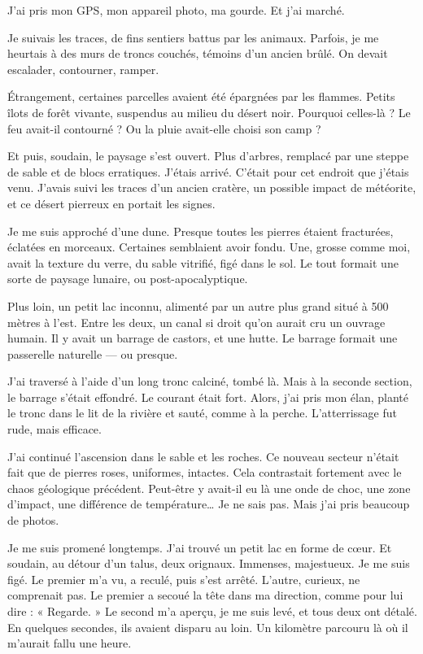 J’ai pris mon GPS, mon appareil photo, ma gourde. Et j’ai marché.

Je suivais les traces, de fins sentiers battus par les animaux. Parfois, je me heurtais à des murs de troncs couchés, témoins d’un ancien brûlé. On devait escalader, contourner, ramper.

Étrangement, certaines parcelles avaient été épargnées par les flammes. Petits îlots de forêt vivante, suspendus au milieu du désert noir. Pourquoi celles-là ? Le feu avait-il contourné ? Ou la pluie avait-elle choisi son camp ?

Et puis, soudain, le paysage s’est ouvert. Plus d’arbres, remplacé par une steppe de sable et de blocs erratiques. J’étais arrivé. C’était pour cet endroit que j’étais venu. J’avais suivi les traces d’un ancien cratère, un possible impact de météorite, et ce désert pierreux en portait les signes.

Je me suis approché d’une dune. Presque toutes les pierres étaient fracturées, éclatées en morceaux. Certaines semblaient avoir fondu. Une, grosse comme moi, avait la texture du verre, du sable vitrifié, figé dans le sol. Le tout formait une sorte de paysage lunaire, ou post-apocalyptique.

Plus loin, un petit lac inconnu, alimenté par un autre plus grand situé à 500 mètres à l’est. Entre les deux, un canal si droit qu’on aurait cru un ouvrage humain. Il y avait un barrage de castors, et une hutte. Le barrage formait une passerelle naturelle — ou presque.

J’ai traversé à l’aide d’un long tronc calciné, tombé là. Mais à la seconde section, le barrage s’était effondré. Le courant était fort. Alors, j’ai pris mon élan, planté le tronc dans le lit de la rivière et sauté, comme à la perche. L’atterrissage fut rude, mais efficace.

J’ai continué l’ascension dans le sable et les roches. Ce nouveau secteur n’était fait que de pierres roses, uniformes, intactes. Cela contrastait fortement avec le chaos géologique précédent. Peut-être y avait-il eu là une onde de choc, une zone d’impact, une différence de température… Je ne sais pas. Mais j’ai pris beaucoup de photos.

Je me suis promené longtemps. J’ai trouvé un petit lac en forme de cœur. Et soudain, au détour d’un talus, deux orignaux. Immenses, majestueux. Je me suis figé. Le premier m’a vu, a reculé, puis s’est arrêté. L’autre, curieux, ne comprenait pas. Le premier a secoué la tête dans ma direction, comme pour lui dire : « Regarde. » Le second m’a aperçu, je me suis levé, et tous deux ont détalé. En quelques secondes, ils avaient disparu au loin. Un kilomètre parcouru là où il m’aurait fallu une heure.

